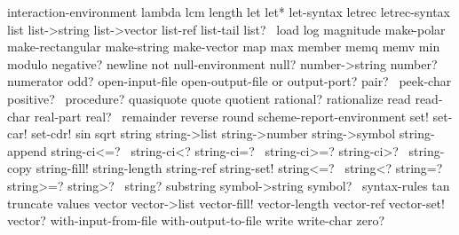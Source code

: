 {\cf interaction-environment} {\cf lambda}
{\cf lcm}                     {\cf length}
{\cf let}                     {\cf let*}
{\cf let-syntax}              {\cf letrec}
{\cf letrec-syntax}           {\cf list}
{\cf list->string}            {\cf list->vector}
{\cf list-ref}                {\cf list-tail}
{\cf list?\ }                  {\cf load}
{\cf log}                     {\cf magnitude}
{\cf make-polar}              {\cf make-rectangular}
{\cf make-string}             {\cf make-vector}
{\cf map}                     {\cf max}
{\cf member}                  {\cf memq}
{\cf memv}                    {\cf min}
{\cf modulo}                  {\cf negative?}
{\cf newline}                 {\cf not}
{\cf null-environment}        {\cf null?}
{\cf number->string}          {\cf number?}
{\cf numerator}               {\cf odd?}
{\cf open-input-file}         {\cf open-output-file}
{\cf or}                      {\cf output-port?}
{\cf pair?\ }                  {\cf peek-char}
{\cf positive?\ }              {\cf procedure?}
{\cf quasiquote}              {\cf quote}
{\cf quotient}                {\cf rational?}
{\cf rationalize}             {\cf read}
{\cf read-char}               {\cf real-part}
{\cf real?\ }                  {\cf remainder}
{\cf reverse}                 {\cf round}
{\cf scheme-report-environment}
{\cf set!}                    {\cf set-car!}
{\cf set-cdr!}                {\cf sin}
{\cf sqrt}                    {\cf string}
{\cf string->list}            {\cf string->number}
{\cf string->symbol}          {\cf string-append}
{\cf string-ci<=?\ }           {\cf string-ci<?}
{\cf string-ci=?\ }            {\cf string-ci>=?}
{\cf string-ci>?\ }            {\cf string-copy}
{\cf string-fill!}            {\cf string-length}
{\cf string-ref}              {\cf string-set!}
{\cf string<=?\ }              {\cf string<?}
{\cf string=?\ }               {\cf string>=?}
{\cf string>?\ }               {\cf string?}
{\cf substring}               {\cf symbol->string}
{\cf symbol?\ }                {\cf syntax-rules}
{\cf tan}                     {\cf truncate}
{\cf values}                  {\cf vector}
{\cf vector->list}            {\cf vector-fill!}
{\cf vector-length}           {\cf vector-ref}
{\cf vector-set!}             {\cf vector?}
{\cf with-input-from-file}    {\cf with-output-to-file}
{\cf write}                   {\cf write-char}
{\cf zero?}

